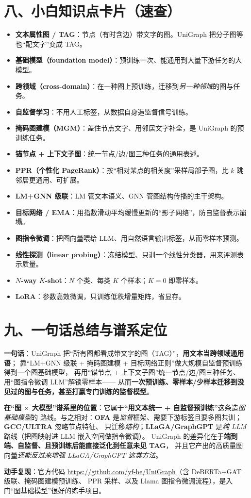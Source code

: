 \documentclass[11pt,UTF8,fontset=fandol]{ctexart}
\begin{document}
\section{八、小白知识点卡片（速查）}
\begin{itemize}[leftmargin=2em]
  \item \textbf{文本属性图 / TAG}：节点（有时含边）带文字的图。UniGraph 把分子图等也“配文字”变成 TAG。
  \item \textbf{基础模型（foundation model）}：预训练一次、能通用到大量下游任务的大模型。
  \item \textbf{跨领域（cross-domain）}：在一种图上预训练，迁移到\emph{另一种领域}的图与任务。
  \item \textbf{自监督学习}：不用人工标签，从数据自身造监督信号训练。
  \item \textbf{掩码图建模（MGM）}：盖住节点文字、用邻居文字补全，是 UniGraph 的预训练任务。
  \item \textbf{锚节点 + 上下文子图}：统一节点/边/图三种任务的通用表述。
  \item \textbf{PPR（个性化 PageRank）}：按“相对某点的相关度”采样局部子图，比 $k$ 跳邻居更通用、可扩展。
  \item \textbf{LM+GNN 级联}：LM 管文本语义、GNN 管图结构传播的主干架构。
  \item \textbf{目标网络 / EMA}：用指数滑动平均缓慢更新的“影子网络”，防自监督表示崩塌。
  \item \textbf{图指令微调}：把图向量喂给 LLM、用自然语言输出标签，从而零样本预测。
  \item \textbf{线性探测（linear probing）}：冻结模型、只训一个线性分类器，用来评测表示质量。
  \item \textbf{$N$-way $K$-shot}：$N$ 个类、每类 $K$ 个样本；$K=0$ 即零样本。
  \item \textbf{LoRA}：参数高效微调，只训练低秩增量矩阵，省显存。
\end{itemize}

\section{九、一句话总结与谱系定位}

\textbf{一句话}：UniGraph 把“所有图都看成带文字的图（TAG）”，\textbf{用文本当跨领域通用语}；
靠“LM+GNN 级联 + 掩码图建模 + 目标网络正则”做大规模自监督预训练得到一个图基础模型，
再用“锚节点 + 上下文子图”统一节点/边/图三种任务、用“图指令微调 LLM”解锁零样本——
从而\textbf{一次预训练、零样本/少样本迁移到没见过的图与任务，甚至打赢专门训练的监督模型}。

\textbf{在“图 $\times$ 大模型”谱系里的位置}：它属于\textbf{“用文本统一 + 自监督预训练”}这条造\emph{图基础模型}的
路线。与之相对：\textbf{OFA} 是\emph{监督}框架、需要下游标签且要多图共训；\textbf{GCC/ULTRA} 忽略节点特征、
只迁移\emph{结构}；\textbf{LLaGA/GraphGPT} 是\emph{纯 LLM}路线（把图映射进 LLM 嵌入空间做指令微调）。
UniGraph 的差异化在于\textbf{端到端、自监督、且预训练后能直接泛化到任意未见 TAG}，
并且它产出的高质量图向量\emph{还能反过来增强 LLaGA/GraphGPT 这类方法}。

\textbf{动手复现}：官方代码 \url{https://github.com/yf-he/UniGraph}（含 DeBERTa+GAT 级联、掩码图建模预训练、
PPR 采样、以及 Llama 图指令微调流程），是入门“图基础模型”很好的练手项目。
\end{document}
